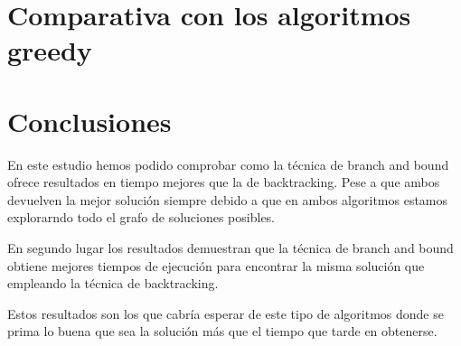 \documentclass{article}
\begin{document}


\section{Comparativa con los algoritmos greedy}

\section{Conclusiones}

En este estudio hemos podido comprobar como la técnica de branch and
bound ofrece resultados en tiempo mejores que la de backtracking. Pese
a que ambos devuelven la mejor solución siempre debido a que en ambos
algoritmos estamos explorarndo todo el grafo de soluciones posibles.

En segundo lugar los resultados demuestran que la técnica de branch
and bound obtiene mejores tiempos de ejecución para encontrar la misma
solución que empleando la técnica de backtracking.

Estos resultados son los que cabría esperar de este tipo de algoritmos
donde se prima lo buena que sea la solución más que el tiempo que
tarde en obtenerse.
\end{document}
